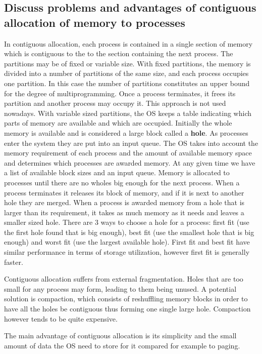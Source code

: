 \documentclass{article}
\begin{document}
\subsection{Discuss problems and advantages of contiguous allocation of memory to processes}
In contiguous allocation, each process is contained in a single section of memory which is contiguous to the to the section containing the next process. The partitions may be of fixed or variable size. With fixed partitions, the memory is divided into a number of partitions of the same size, and each process occupies one partition. In this case the number of partitions constitutes an upper bound for the degree of multiprogramming. Once a process terminates, it frees its partition and another process may occupy it. This approach is not used nowadays. With variable sized partitions, the OS keeps a table indicating which parts of memory are available and which are occupied. Initially the whole memory is available and is considered a large block called a \textbf{hole}. As processes enter the system they are put into an input queue. The OS takes into account the memory requirement of each process and the amount of available memory space and determines which processes are awarded memory. At any given time we have a list of available block sizes and an input queue. Memory is allocated to processes until there are no wholes big enough for the next process. When a process terminates it releases its block of memory, and if it is next to another hole they are merged. When a process is awarded memory from a hole that is larger than its requirement, it takes as much memory as it needs and leaves a smaller sized hole. There are 3 ways to choose a hole for a process: first fit (use the first hole found that is big enough), best fit (use the smallest hole that is big enough) and worst fit (use the largest available hole). First fit and best fit have similar performance in terms of storage utilization, however first fit is generally faster.

Contiguous allocation suffers from external fragmentation. Holes that are too small for any process may form, leading to them being unused. A potential solution is compaction, which consists of reshuffling memory blocks in order to have all the holes be contiguous thus forming one single large hole. Compaction however tends to be quite expensive.

The main advantage of contiguous allocation is its simplicity and the small amount of data the OS need to store for it compared for example to paging.
\end{document}
